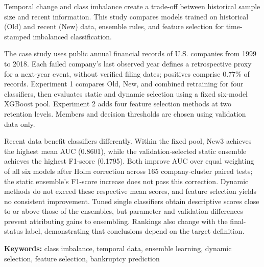Temporal change and class imbalance create a trade-off between historical sample size and recent information. This study compares models trained on historical (Old) and recent (New) data, ensemble rules, and feature selection for time-stamped imbalanced classification.

The case study uses public annual financial records of U.S. companies from 1999 to 2018. Each failed company's last observed year defines a retrospective proxy for a next-year event, without verified filing dates; positives comprise 0.77\% of records. Experiment 1 compares Old, New, and combined retraining for four classifiers, then evaluates static and dynamic selection using a fixed six-model XGBoost pool. Experiment 2 adds four feature selection methods at two retention levels. Members and decision thresholds are chosen using validation data only.

Recent data benefit classifiers differently. Within the fixed pool, New3 achieves the highest mean AUC (0.8601), while the validation-selected static ensemble achieves the highest F1-score (0.1795). Both improve AUC over equal weighting of all six models after Holm correction across 165 company-cluster paired tests; the static ensemble's F1-score increase does not pass this correction. Dynamic methods do not exceed these respective mean scores, and feature selection yields no consistent improvement. Tuned single classifiers obtain descriptive scores close to or above those of the ensembles, but parameter and validation differences prevent attributing gains to ensembling. Rankings also change with the final-status label, demonstrating that conclusions depend on the target definition.

\noindent\textbf{Keywords:} class imbalance, temporal data, ensemble learning, dynamic selection, feature selection, bankruptcy prediction
